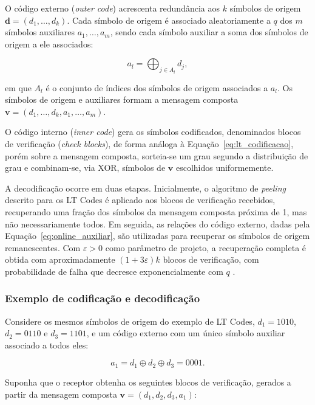 O código externo (\emph{outer code}) acrescenta redundância aos $k$ símbolos de origem $\mathbf{d} = (d_1, \ldots, d_k)$. Cada símbolo de origem é associado aleatoriamente a $q$ dos $m$ símbolos auxiliares $a_1, \ldots, a_m$, sendo cada símbolo auxiliar a soma dos símbolos de origem a ele associados:

\begin{equation}
	a_l = \bigoplus_{j \in A_l} d_j,
	\label{eq:online_auxiliar}
\end{equation}

\noindent em que $A_l$ é o conjunto de índices dos símbolos de origem associados a $a_l$. Os símbolos de origem e auxiliares formam a mensagem composta $\mathbf{v} = (d_1, \ldots, d_k, a_1, \ldots, a_m)$.

O código interno (\emph{inner code}) gera os símbolos codificados, denominados blocos de verificação (\emph{check blocks}), de forma análoga à Equação~\eqref{eq:lt_codificacao}, porém sobre a mensagem composta, sorteia-se um grau segundo a distribuição de grau e combinam-se, via XOR, símbolos de $\mathbf{v}$ escolhidos uniformemente.

A decodificação ocorre em duas etapas. Inicialmente, o algoritmo de \emph{peeling} descrito para os LT Codes é aplicado aos blocos de verificação recebidos, recuperando uma fração dos símbolos da mensagem composta próxima de 1, mas não necessariamente todos. Em seguida, as relações do código externo, dadas pela Equação~\eqref{eq:online_auxiliar}, são utilizadas para recuperar os símbolos de origem remanescentes. Com $\varepsilon > 0$ como parâmetro de projeto, a recuperação completa é obtida com aproximadamente $(1 + 3\varepsilon)k$ blocos de verificação, com probabilidade de falha que decresce exponencialmente com $q$ \cite{maymounkov2002online}.

\subsubsection{Exemplo de codificação e decodificação}%
Considere os mesmos símbolos de origem do exemplo de LT Codes, $d_1 = 1010$, $d_2 = 0110$ e $d_3 = 1101$, e um código externo com um único símbolo auxiliar associado a todos eles:

\begin{equation}
	a_1 = d_1 \oplus d_2 \oplus d_3 = 0001.
\end{equation}

Suponha que o receptor obtenha os seguintes blocos de verificação, gerados a partir da mensagem composta $\mathbf{v} = (d_1, d_2, d_3, a_1)$:

